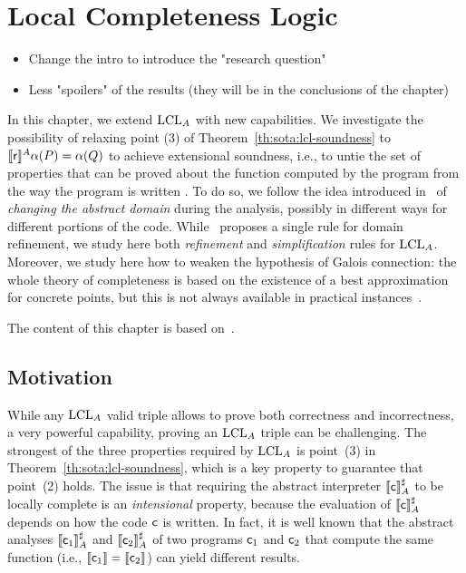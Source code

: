 
\chapter{Local Completeness Logic}\label{ch:lcla}
\begin{itemize}
	\item Change the intro to introduce the "research question"
	\item Less "spoilers" of the results (they will be in the conclusions of the chapter)
\end{itemize}

In this chapter, we extend $\text{LCL}_A$ with new capabilities. We investigate the possibility of relaxing point (3) of Theorem~\ref{th:sota:lcl-soundness} to $\llbracket\mathsf{r}\rrbracket^{A} \alpha(P) = \alpha(Q)$ to achieve extensional soundness, i.e., to untie the set of properties that can be proved about the function computed by the program from the way the program is written . To do so, we follow the idea introduced in~\cite{BGGR23} of \emph{changing the abstract domain} during the analysis, possibly in different ways for different portions of the code.
While~\cite{BGGR23} proposes a single rule for domain refinement, we study here both \emph{refinement} and \emph{simplification} rules for $\text{LCL}_A$.
Moreover, we study here how to weaken the hypothesis of Galois connection: the whole theory of completeness is based on the existence of a best approximation for concrete points, but this is not always available in practical instances~\cite{CC92}.

The content of this chapter is based on~\cite{ABG23}.

\section{Motivation}

While any $\text{LCL}_A$ valid triple allows to prove both correctness and incorrectness, a very powerful capability, proving an $\text{LCL}_A$ triple can be challenging.
The strongest of the three properties required by $\text{LCL}_A$ is point~(3) in Theorem~\ref{th:sota:lcl-soundness}, which is a key property to guarantee that point~(2) holds.
The issue is that requiring the abstract interpreter $\llbracket\mathsf{c}\rrbracket^{\sharp}_{A}$ to be locally complete is an \emph{intensional} property, because the evaluation of $\llbracket\mathsf{c}\rrbracket^{\sharp}_{A}$ depends on how the code $\mathsf{c}$ is written.
In fact, it is well known that the abstract analyses $\llbracket\mathsf{c}_1\rrbracket^{\sharp}_{A}$ and $\llbracket\mathsf{c}_2\rrbracket^{\sharp}_{A}$ of two programs $\mathsf{c}_1$ and $\mathsf{c}_2$ that compute the same function (i.e., $\llbracket\mathsf{c}_1\rrbracket=\llbracket\mathsf{c}_2\rrbracket$) can yield different results.

